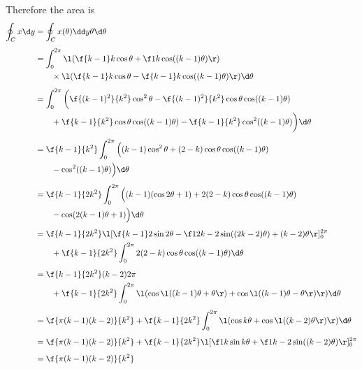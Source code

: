 \documentclass[a4paper]{article}
\begin{document}
Therefore the area is \begin{align*}
\oint_C x \d y &= \oint_C x(\theta) \dd y\theta \d \theta \\[1ex]
&= \int_0^{2\pi} \l(
	\f{k-1}k \cos \theta + \f1k \cos ((k-1) \theta) \r)
	\\ &\qquad \times \l(
		\f{k-1}k \cos \theta
		- \f{k-1}k \cos ((k-1) \theta)
	\r) \d \theta \\[1ex]
%
&= \int_0^{2\pi} \bigg(
	\f{(k-1)^2}{k^2} \cos^2 \theta
	- \f{(k-1)^2}{k^2} \cos \theta \cos ((k-1) \theta)
	\\ &\qquad + \f{k-1}{k^2} \cos \theta \cos ((k-1) \theta)
	- \f{k-1}{k^2} \cos^2 ((k-1) \theta)
\bigg) \d \theta \\[1ex]
%
&= \f{k-1}{k^2} \int_0^{2\pi} \Big(
	(k-1) \cos^2 \theta
	+ (2-k) \cos \theta \cos ((k-1) \theta)
	\\ &\qquad - \cos^2 ((k-1) \theta)
\Big) \d \theta \\[1ex]
%
&= \f{k-1}{2k^2} \int_0^{2\pi} \Big(
	(k-1) (\cos 2\theta + 1)
	+ 2(2-k) \cos \theta \cos ((k-1) \theta)
	\\ &\qquad - \cos (2(k-1) \theta + 1)
\Big) \d \theta \\[1ex]
%
&= \f{k-1}{2k^2} \l[
	\f{k-1}2 \sin 2\theta
	- \f1{2k-2} \sin ((2k-2) \theta)
	+ (k-2) \theta
\r]_0^{2\pi}
	\\ &\qquad + \f{k-1}{2k^2} \int_0^{2\pi}
		2(2-k) \cos \theta \cos ((k-1) \theta)
	\d \theta \\[1ex]
%
&= \f{k-1}{2k^2} (k-2) 2\pi
	\\ &\qquad + \f{k-1}{2k^2} \int_0^{2\pi} \l(
		\cos \l( (k-1) \theta + \theta \r) + \cos \l( (k-1) \theta - \theta \r)
	\r) \d \theta \\[1ex]
%
&= \f{\pi (k-1) (k-2)}{k^2}
	+ \f{k-1}{2k^2} \int_0^{2\pi} \l(
		\cos k \theta + \cos \l( (k-2) \theta \r)
	\r) \d \theta \\[1ex]
%
&= \f{\pi (k-1) (k-2)}{k^2}
	+ \f{k-1}{2k^2} \l[ \f1k \sin k \theta + \f1{k-2} \sin ((k-2) \theta) \r]_0^{2\pi} \\[1ex]
%
&= \f{\pi (k-1) (k-2)}{k^2}
\end{align*}

\end{document}
